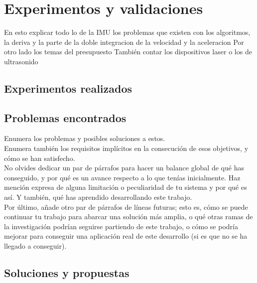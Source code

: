 \chapter{Experimentos y validaciones}
\label{cap:capitulo4}

En esto explicar todo lo de la IMU los problemas que existen con los algoritmos, la deriva y la parte de la doble integracion de la velocidad y la aceleracion
Por otro lado los temas del presupuesto
También contar los dispositivos laser o los de ultrasonido
\vspace{0.45cm}

\section{Experimentos realizados}

\section{Problemas encontrados}

Enumera los problemas y posibles soluciones a estos.\\

Enumera también los requisitos implícitos en la consecución de esos objetivos, y cómo se han satisfecho.\\

No olvides dedicar un par de párrafos para hacer un balance global de qué has conseguido, y por qué es un avance respecto a lo que tenías inicialmente. Haz mención expresa de alguna limitación o peculiaridad de tu sistema y por qué es así. Y también, qué has aprendido desarrollando este trabajo.\\

Por último, añade otro par de párrafos de líneas futuras; esto es, cómo se puede continuar tu trabajo para abarcar una solución más amplia, o qué otras ramas de la investigación podrían seguirse partiendo de este trabajo, o cómo se podría mejorar para conseguir una aplicación real de este desarrollo (si es que no se ha llegado a conseguir).

\section{Soluciones y propuestas}
